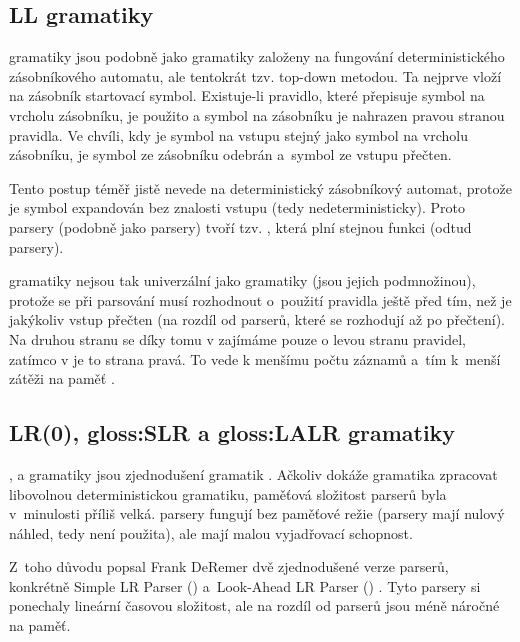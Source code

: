 		\subsection{LL gramatiky}
			\label{sec:LLgrammars}
			\LLk gramatiky \cite{Blythe:1994:LLV:191033.191121} jsou podobně jako \LRk gramatiky založeny na fungování deterministického zásobníkového automatu, ale tentokrát tzv. top-down metodou. Ta nejprve vloží na zásobník startovací symbol. Existuje-li pravidlo, které přepisuje symbol na vrcholu zásobníku, je použito a symbol na zásobníku je nahrazen pravou stranou pravidla. Ve chvíli, kdy je symbol na vstupu stejný jako symbol na vrcholu zásobníku, je symbol ze zásobníku odebrán a~symbol ze vstupu přečten.
			
			Tento postup téměř jistě nevede na deterministický zásobníkový automat, protože je symbol expandován bez znalosti vstupu (tedy nedeterministicky). Proto \LLk parsery (podobně jako \LRk parsery) tvoří tzv. , která plní stejnou funkci (odtud \LLk parsery).
			
			\LLk gramatiky nejsou tak univerzální jako \LRk gramatiky (jsou jejich podmnožinou), protože se při parsování musí rozhodnout o~použití pravidla ještě před tím, než je jakýkoliv vstup přečten (na rozdíl od \LRk parserů, které se rozhodují až po přečtení). Na druhou stranu se díky tomu v  zajímáme pouze o levou stranu pravidel, zatímco v  je to strana pravá. To vede k menšímu počtu záznamů a~tím k~menší zátěži na paměť \cite{Blythe:1994:LLV:191033.191121}.
		
		\subsection{LR(0), \gls{gloss:SLR} a \gls{gloss:LALR} gramatiky}
			,  a  gramatiky jsou zjednodušení \LRk gramatik \cite{Chapman:1987:LPT:40693}. Ačkoliv dokáže \LRk gramatika zpracovat libovolnou deterministickou gramatiku, paměťová složitost \LRk parserů byla v~minulosti příliš velká.  parsery fungují bez paměťové režie (parsery mají nulový náhled, tedy  není použita), ale mají malou vyjadřovací schopnost.
			
			Z~toho důvodu popsal Frank DeRemer dvě zjednodušené verze \LRk parserů, konkrétně Simple LR Parser () a~Look-Ahead LR Parser () \cite{Deremer:1969:PTL:888578}.
			Tyto parsery si ponechaly lineární časovou složitost, ale na rozdíl od \LRk parserů jsou méně náročné na paměť.
			
